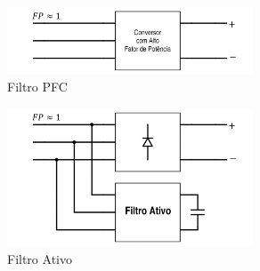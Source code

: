 \begin{figure}[!htbp]
	\centering
	\includegraphics[width=0.65\textwidth]{Cap2/Figuras/sch_PFC.png}
	\caption{Filtro PFC}
	\label{fig:sch_PFC}
\end{figure}

\begin{figure}[!htbp]
	\centering
	\includegraphics[width=0.65\textwidth]{Cap2/Figuras/sch_filtro_ativo.png}
	\caption{Filtro Ativo}
	\label{fig:sch_filtro_ativo}
\end{figure}



